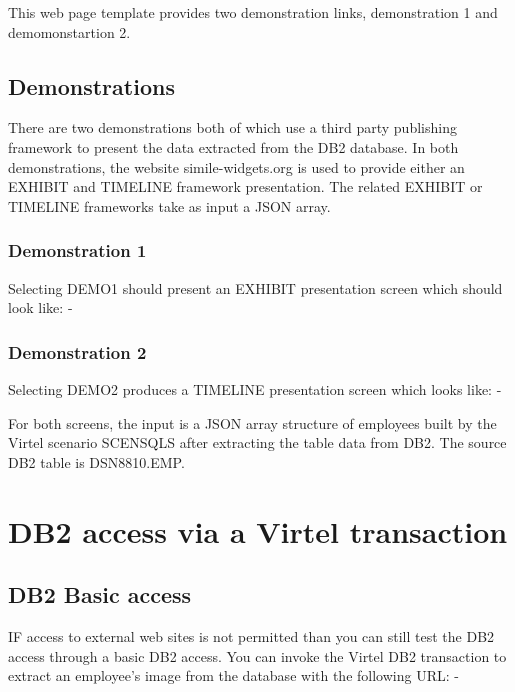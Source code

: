 \documentclass[letterpaper,10pt,english]{sphinxmanual}
\begin{document}
This web page template provides two demonstration links, demonstration 1 and demomonstartion 2.


\section{Demonstrations}
\label{\detokenize{TN201906:demonstrations}}
There are two demonstrations both of which use a third party publishing framework to present the data extracted from the DB2 database. In both demonstrations, the website simile-widgets.org is used to provide either an EXHIBIT and TIMELINE framework presentation. The related EXHIBIT or TIMELINE frameworks take as input a JSON array.


\subsection{Demonstration 1}
\label{\detokenize{TN201906:demonstration-1}}
Selecting DEMO1 should present an EXHIBIT presentation screen which should look like: -



\subsection{Demonstration 2}
\label{\detokenize{TN201906:demonstration-2}}
Selecting DEMO2 produces a TIMELINE presentation screen which looks like: -


For both screens, the input is a JSON array structure of employees built by the Virtel scenario SCENSQLS after extracting the table data from DB2. The source DB2 table is DSN8810.EMP.


\chapter{DB2 access via a Virtel transaction}
\label{\detokenize{TN201906:db2-access-via-a-virtel-transaction}}

\section{DB2 Basic access}
\label{\detokenize{TN201906:db2-basic-access}}
IF access to external web sites is not permitted than you can still test the DB2 access through a basic DB2 access. You can invoke the Virtel DB2 transaction to extract an employee’s image from the database with the following URL: -
\end{document}
